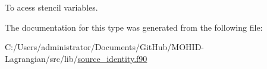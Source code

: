 To acess stencil variables. 



The documentation for this type was generated from the following file\+:\begin{DoxyCompactItemize}
\item 
C\+:/\+Users/administrator/\+Documents/\+Git\+Hub/\+M\+O\+H\+I\+D-\/\+Lagrangian/src/lib/\mbox{\hyperlink{source__identity_8f90}{source\+\_\+identity.\+f90}}\end{DoxyCompactItemize}
